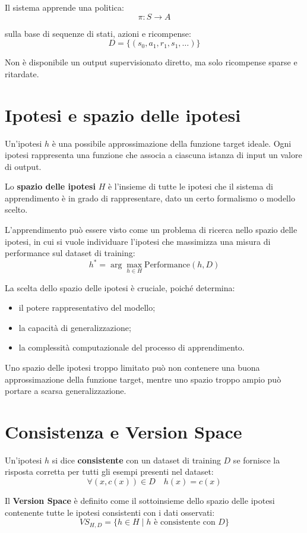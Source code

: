 \documentclass[a4paper,12pt]{report}
\begin{document}
Il sistema apprende una politica:
\[
\pi : S \rightarrow A
\]

sulla base di sequenze di stati, azioni e ricompense:
\[
D = \{(s_0, a_1, r_1, s_1, \dots)\}
\]

Non è disponibile un output supervisionato diretto, ma solo ricompense sparse e ritardate.

\section{Ipotesi e spazio delle ipotesi}

Un’ipotesi \( h \) è una possibile approssimazione della funzione target ideale.
Ogni ipotesi rappresenta una funzione che associa a ciascuna istanza di input un valore di output.

Lo \textbf{spazio delle ipotesi} \( H \) è l’insieme di tutte le ipotesi che il sistema di apprendimento è in grado di rappresentare, dato un certo formalismo o modello scelto.

L’apprendimento può essere visto come un problema di ricerca nello spazio delle ipotesi, in cui si vuole individuare l’ipotesi che massimizza una misura di performance sul dataset di training:
\[
h^* = \arg\max_{h \in H} \text{Performance}(h, D)
\]

La scelta dello spazio delle ipotesi è cruciale, poiché determina:
\begin{itemize}
    \item il potere rappresentativo del modello;
    \item la capacità di generalizzazione;
    \item la complessità computazionale del processo di apprendimento.
\end{itemize}

Uno spazio delle ipotesi troppo limitato può non contenere una buona approssimazione della funzione target, mentre uno spazio troppo ampio può portare a scarsa generalizzazione.


\section{Consistenza e Version Space}

Un’ipotesi \( h \) si dice \textbf{consistente} con un dataset di training \( D \) se fornisce la risposta corretta per tutti gli esempi presenti nel dataset:
\[
\forall (x, c(x)) \in D \quad h(x) = c(x)
\]

Il \textbf{Version Space} è definito come il sottoinsieme dello spazio delle ipotesi contenente tutte le ipotesi consistenti con i dati osservati:
\[
VS_{H,D} = \{ h \in H \mid h \text{ è consistente con } D \}
\]
\end{document}
